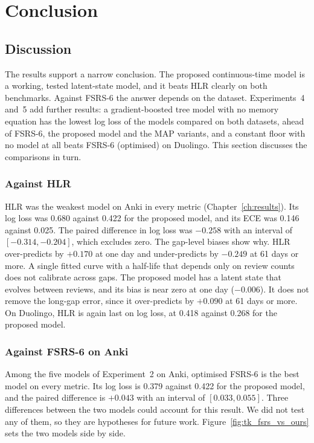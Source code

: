 \chapter{Conclusion}
\label{ch:conclusion}

\section{Discussion}
\label{sec:concl-discussion}

The results support a narrow conclusion. The proposed continuous-time model is a working, tested
latent-state model, and it beats HLR clearly on both benchmarks. Against FSRS-6 the answer depends on
the dataset. Experiments~4 and~5 add further results: a gradient-boosted tree model with no memory equation has the lowest log loss of the models compared on both datasets, ahead of FSRS-6, the proposed model and the MAP variants, and a constant floor with no model at all beats FSRS-6 (optimised) on Duolingo. This section discusses the comparisons in turn.

\subsection*{Against HLR}

HLR was the weakest model on Anki in every metric (Chapter~\ref{ch:results}). Its log loss was 0.680
against 0.422 for the proposed model, and its ECE was 0.146 against 0.025. The paired difference in log loss
was $-0.258$ with an interval of $[-0.314, -0.204]$, which excludes zero. The gap-level biases show why. HLR
over-predicts by $+0.170$ at one day and under-predicts by $-0.249$ at 61 days or more. A single fitted
curve with a half-life that depends only on review counts does not calibrate across gaps. The proposed model
has a latent state that evolves between reviews, and its bias is near zero at one day ($-0.006$). It does not
remove the long-gap error, since it over-predicts by $+0.090$ at 61 days or more. On Duolingo, HLR is again last
on log loss, at 0.418 against 0.268 for the proposed model.

\subsection*{Against FSRS-6 on Anki}

Among the five models of Experiment~2 on Anki, optimised FSRS-6 is the best model on every metric. Its log loss is 0.379 against 0.422 for the
proposed model, and the paired difference is $+0.043$ with an interval of $[0.033, 0.055]$. Three differences between
the two models could account for this result. We did not test any of them, so they are hypotheses for future work.
Figure~\ref{fig:tk_fsrs_vs_ours} sets the two models side by side.

